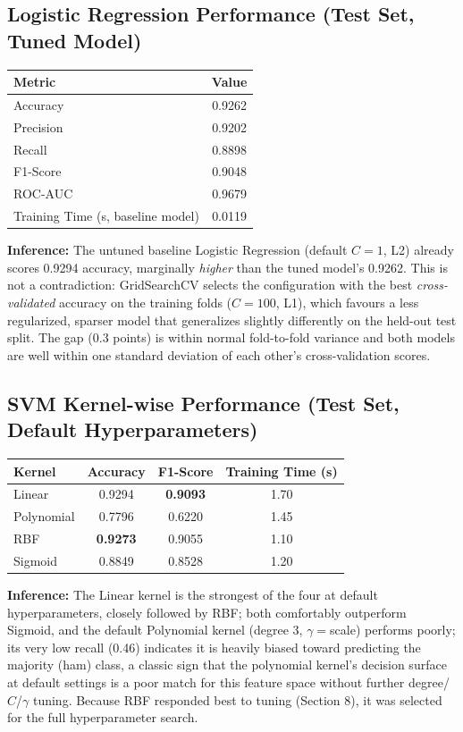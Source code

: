 \documentclass[12pt,a4paper]{article}
\begin{document}
\subsection*{Logistic Regression Performance (Test Set, Tuned Model)}
\begin{tabular}{lc}
\toprule
Metric & Value \\
\midrule
Accuracy & 0.9262 \\
Precision & 0.9202 \\
Recall & 0.8898 \\
F1-Score & 0.9048 \\
ROC-AUC & 0.9679 \\
Training Time (s, baseline model) & 0.0119 \\
\bottomrule
\end{tabular}
\vspace{2mm}

\textbf{Inference:} The untuned baseline Logistic Regression (default $C=1$, L2) already
scores 0.9294 accuracy, marginally \emph{higher} than the tuned model's 0.9262. This is
not a contradiction: GridSearchCV selects the configuration with the best
\emph{cross-validated} accuracy on the training folds ($C=100$, L1), which favours a less
regularized, sparser model that generalizes slightly differently on the held-out test
split. The gap (0.3 points) is within normal fold-to-fold variance and both models are
well within one standard deviation of each other's cross-validation scores.

\subsection*{SVM Kernel-wise Performance (Test Set, Default Hyperparameters)}
\begin{tabular}{lccc}
\toprule
Kernel & Accuracy & F1-Score & Training Time (s) \\
\midrule
Linear & 0.9294 & \textbf{0.9093} & 1.70 \\
Polynomial & 0.7796 & 0.6220 & 1.45 \\
RBF & \textbf{0.9273} & 0.9055 & 1.10 \\
Sigmoid & 0.8849 & 0.8528 & 1.20 \\
\bottomrule
\end{tabular}
\vspace{2mm}

\textbf{Inference:} The Linear kernel is the strongest of the four at default
hyperparameters, closely followed by RBF; both comfortably outperform Sigmoid, and the
default Polynomial kernel (degree 3, $\gamma=$scale) performs poorly; its very low
recall (0.46) indicates it is heavily biased toward predicting the majority (ham) class,
a classic sign that the polynomial kernel's decision surface at default settings is a
poor match for this feature space without further degree/$C$/$\gamma$ tuning. Because RBF
responded best to tuning (Section 8), it was selected for the full hyperparameter search.
\end{document}
